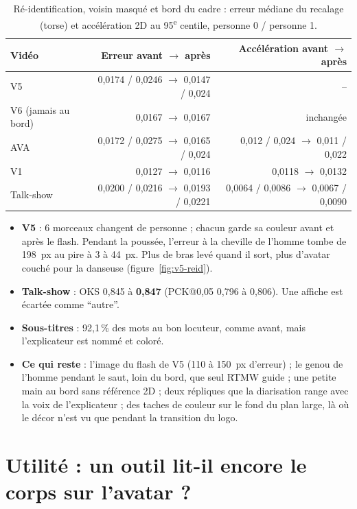 \documentclass[11pt,a4paper]{report}
\begin{document}
\begin{table}[H]
\centering
\caption{Ré-identification, voisin masqué et bord du cadre : erreur médiane du recalage (torse) et accélération 2D au 95\textsuperscript{e}
centile, personne 0 / personne 1.}
\label{tab:reid-res}
\small
\begin{tabularx}{\textwidth}{@{}Yrr@{}}
\toprule
Vidéo & Erreur avant $\to$ après & Accélération avant $\to$ après \\
\midrule
V5 & 0,0174 / 0,0246 $\to$ 0,0147 / 0,024 & -- \\
V6 (jamais au bord) & 0,0167 $\to$ 0,0167 & inchangée \\
AVA & 0,0172 / 0,0275 $\to$ 0,0165 / 0,024 & 0,012 / 0,024 $\to$ 0,011 / 0,022 \\
V1 & 0,0127 $\to$ 0,0116 & 0,0118 $\to$ 0,0132 \\
Talk-show & 0,0200 / 0,0216 $\to$ 0,0193 / 0,0221 & 0,0064 / 0,0086 $\to$ 0,0067 / 0,0090 \\
\bottomrule
\end{tabularx}
\end{table}

\begin{itemize}
    \item \textbf{V5} : 6 morceaux changent de personne ; chacun garde sa couleur avant et après le flash. Pendant la poussée, l'erreur
    à la cheville de l'homme tombe de 198~px au pire à 3 à 44~px. Plus de bras levé quand il sort, plus d'avatar couché pour la danseuse
    (figure~\ref{fig:v5-reid}).
    \item \textbf{Talk-show} : OKS 0,845 à \textbf{0,847} (PCK@0,05 0,796 à 0,806). Une affiche est écartée comme \enquote{autre}.
    \item \textbf{Sous-titres} : 92,1\,\% des mots au bon locuteur, comme avant, mais l'explicateur est nommé et coloré.
    \item \textbf{Ce qui reste} : l'image du flash de V5 (110 à 150~px d'erreur) ; le genou de l'homme pendant le saut, loin du bord,
    que seul RTMW guide ; une petite main au bord sans référence 2D ; deux répliques que la diarisation range avec la voix de
    l'explicateur ; des taches de couleur sur le fond du plan large, là où le décor n'est vu que pendant la transition du logo.
\end{itemize}

\section{Utilité : un outil lit-il encore le corps sur l'avatar ?}
\label{sec:res-utility}
\end{document}
